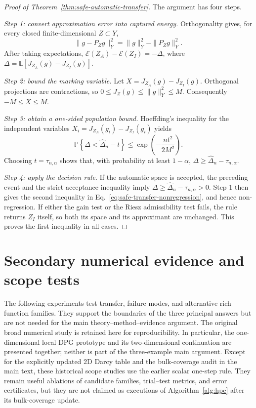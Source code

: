 \documentclass[11pt]{article}
\numberwithin{algorithm}{section}
\theoremstyle{definition}\newtheorem{definition}[theorem]{Definition}
\theoremstyle{remark}\newtheorem{remark}[theorem]{Remark}
\begin{document}
\begin{proof}[Proof of Theorem~\ref{thm:safe-automatic-transfer}]
The argument has four steps.

\emph{Step 1: convert approximation error into captured energy.}
Orthogonality gives, for every closed finite-dimensional $Z\subset Y$,
\[
 \|g-P_Zg\|_Y^2=\|g\|_Y^2-\|P_Zg\|_Y^2.
\]
After taking expectations,
$\mathcal E(Z_A)-\mathcal E(Z_I)=-\Delta$, where
$\Delta=\mathbb E[J_{Z_A}(g)-J_{Z_I}(g)]$.

\emph{Step 2: bound the marking variable.}
Let $X=J_{Z_A}(g)-J_{Z_I}(g)$.  Orthogonal projections are contractions, so
$0\leq J_Z(g)\leq\|g\|_Y^2\leq M$.  Consequently $-M\leq X\leq M$.

\emph{Step 3: obtain a one-sided population bound.}
Hoeffding's inequality for the independent variables
$X_i=J_{Z_A}(g_i)-J_{Z_I}(g_i)$ yields
\[
 \mathbb P\!\left\{\Delta<\widehat\Delta_n-t\right\}
 \leq \exp\!\left(-\frac{nt^2}{2M^2}\right).
\]
Choosing $t=\tau_{n,\alpha}$ shows that, with probability at least
$1-\alpha$, $\Delta\geq\widehat\Delta_n-\tau_{n,\alpha}$.

\emph{Step 4: apply the decision rule.}
If the automatic space is accepted, the preceding event and the strict
acceptance inequality imply
$\Delta\geq\widehat\Delta_n-\tau_{n,\alpha}>0$.
Step 1 then gives the second inequality in
Eq.~\eqref{eq:safe-transfer-nonregression}, and hence non-regression.  If either
the gain test or the Riesz admissibility test fails, the rule returns $Z_I$
itself, so both its space and its approximant are unchanged.  This proves the
first inequality in all cases.
\end{proof}
\iffalse
\storedtheoryB
\storedtheoryC
\storedtheoryD

\section{Secondary numerical evidence and scope tests}
\label{app:secondary-numerics}
The following experiments test transfer, failure modes, and alternative rich
function families.  They support the boundaries of the three principal
answers but are not needed for the main theory--method--evidence argument.
The original broad numerical study is retained here for reproducibility.  In
particular, the one-dimensional local DPG prototype and its two-dimensional
continuation are presented together; neither is part of the three-example
main argument.  Except for the explicitly updated 2D Darcy table and the
bulk-coverage audit in the main text, these historical scope studies use the
earlier scalar one-step rule.  They remain useful ablations of candidate
families, trial--test metrics, and error certificates, but they are not claimed
as executions of Algorithm~\ref{alg:hpc} after its bulk-coverage update.
\storednumericsD
\storednumericsA
\storednumericsE
\storednumericsB
\storednumericsC
\end{document}
